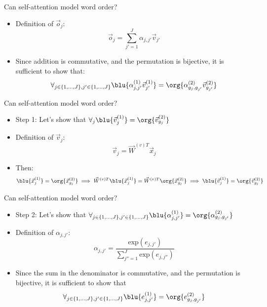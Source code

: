 \documentclass[11pt,compress,t,notes=noshow, xcolor=table]{beamer}
\begin{document}

\begin{vbframe}{Can self-attention model word order?}

\vfill

\begin{itemize}
\item Definition of $\vec o_j$:
$$\vec o_j = \sum_{j'=1}^J \alpha_{j,j'} \vec v_{j'}$$
\item Since addition is commutative, and the permutation is bijective, it is sufficient to show that:
$$\forall_{j \in \{1,...,J\}, j' \in \{1,...,J\}} \blu{\alpha^{(1)}_{j,j'} \vec v^{(1)}_{j'}} = \org{\alpha^{(2)}_{g_j,g_{j'}} \vec v^{(2)}_{g_{j'}}}$$
\end{itemize}

\vfill

\end{vbframe}


\begin{vbframe}{Can self-attention model word order?}

\vfill

\begin{itemize}
\item Step 1: Let's show that $\forall_{j} \blu{\vec v^{(1)}_{j}} = \org{\vec v^{(2)}_{g_{j}}}$
\item Definition of $\vec v_j$:
$$\vec v_j = \vec W^{(v)T} \vec x_j$$
\item Then:
$$\blu{\vec x^{(1)}_{j}} = \org{\vec x^{(2)}_{g_{j}}} \implies \vec W^{(v)T} \blu{\vec x^{(1)}_{j}} = \vec W^{(v)T} \org{\vec x^{(2)}_{g_{j}}} \implies \blu{\vec v^{(1)}_j} = \org{\vec v^{(2)}_{g_j}}$$
\end{itemize}

\vfill

\end{vbframe}


\begin{vbframe}{Can self-attention model word order?}

\vfill

\begin{itemize}
\item Step 2: Let's show that $\forall_{j \in \{1,...,J\}, j' \in \{1,...,J\}} \blu{\alpha^{(1)}_{j, j'}} = \org{\alpha^{(2)}_{g_j, g_{j'}}}$
\item Definition of $\alpha_{j,j'}$:
$$\alpha_{j,j'} = \frac{\mathrm{exp}(e_{j,j'})}{\sum_{j''=1}^J \mathrm{exp}(e_{j,j''})}$$
\item Since the sum in the denominator is commutative, and the permutation is bijective, it is sufficient to show that
$$\forall_{j \in \{1,...,J\}, j' \in \{1,...,J\}} \blu{e^{(1)}_{j,j'}} = \org{e^{(2)}_{g_j, g_{j'}}}$$
\end{itemize}

\vfill

\end{vbframe}
\end{document}
